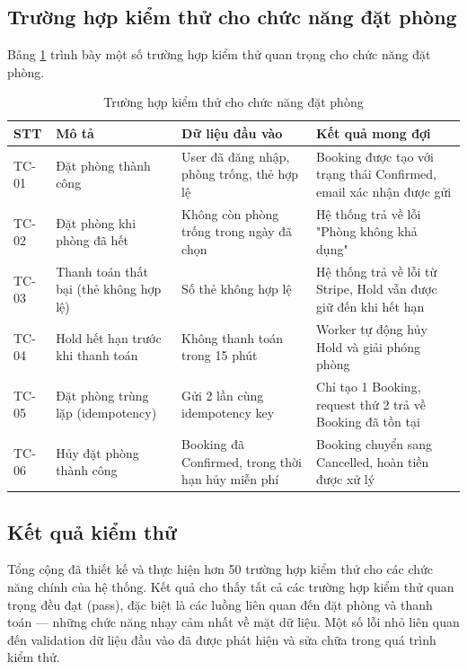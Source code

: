 \documentclass[13pt,a4paper,twoside]{report}
\begin{document}
\subsection{Trường hợp kiểm thử cho chức năng đặt phòng}

Bảng \ref{tab:test_booking} trình bày một số trường hợp kiểm thử quan trọng cho chức năng đặt phòng.

\begin{table}[H]
  \centering
  \caption{Trường hợp kiểm thử cho chức năng đặt phòng}
  \label{tab:test_booking}
  \begin{tabularx}{\textwidth}{p{1cm} p{3cm} X X}
    \toprule
    \textbf{STT} & \textbf{Mô tả} & \textbf{Dữ liệu đầu vào} & \textbf{Kết quả mong đợi} \\
    \midrule
    TC-01 & Đặt phòng thành công & User đã đăng nhập, phòng trống, thẻ hợp lệ & Booking được tạo với trạng thái Confirmed, email xác nhận được gửi \\
    TC-02 & Đặt phòng khi phòng đã hết & Không còn phòng trống trong ngày đã chọn & Hệ thống trả về lỗi "Phòng không khả dụng" \\
    TC-03 & Thanh toán thất bại (thẻ không hợp lệ) & Số thẻ không hợp lệ & Hệ thống trả về lỗi từ Stripe, Hold vẫn được giữ đến khi hết hạn \\
    TC-04 & Hold hết hạn trước khi thanh toán & Không thanh toán trong 15 phút & Worker tự động hủy Hold và giải phóng phòng \\
    TC-05 & Đặt phòng trùng lặp (idempotency) & Gửi 2 lần cùng idempotency key & Chỉ tạo 1 Booking, request thứ 2 trả về Booking đã tồn tại \\
    TC-06 & Hủy đặt phòng thành công & Booking đã Confirmed, trong thời hạn hủy miễn phí & Booking chuyển sang Cancelled, hoàn tiền được xử lý \\
    \bottomrule
  \end{tabularx}
\end{table}

\subsection{Kết quả kiểm thử}

Tổng cộng đã thiết kế và thực hiện hơn 50 trường hợp kiểm thử cho các chức năng chính của hệ thống. Kết quả cho thấy tất cả các trường hợp kiểm thử quan trọng đều đạt (pass), đặc biệt là các luồng liên quan đến đặt phòng và thanh toán --- những chức năng nhạy cảm nhất về mặt dữ liệu. Một số lỗi nhỏ liên quan đến validation dữ liệu đầu vào đã được phát hiện và sửa chữa trong quá trình kiểm thử.
\end{document}
